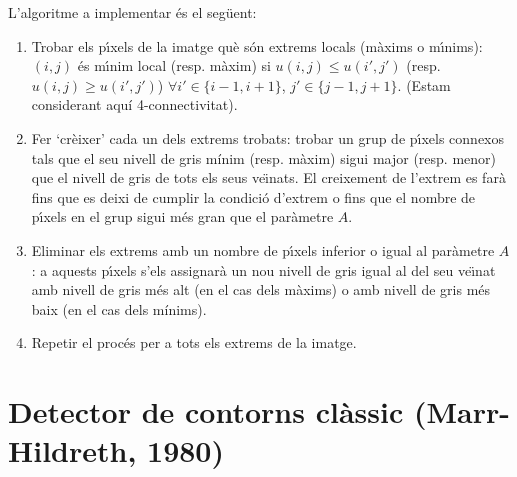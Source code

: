 \documentclass{article}
\begin{document}
L'algoritme a implementar \'es el seg\"uent:
\begin{enumerate}
\item Trobar els p\'\i xels de la imatge qu\`e s\'on extrems locals (m\`axims
o m\'\i nims): $(i,j)$ \'es m\'\i nim local (resp. m\`axim) si $u(i,j) \leq u(i',j')$
(resp. $u(i,j) \geq u(i',j')$) $\forall i' \in \{i-1,i+1\}$, $j' \in \{j-1,j+1\}$. 
(Estam considerant aqu\'i 4-connectivitat).
\item Fer `cr\`eixer' cada un dels extrems trobats: trobar un grup de p\'\i xels connexos
tals que el seu nivell de gris m\'inim (resp. m\`axim) sigui major (resp. menor) que el
nivell de gris de tots els seus ve\"\i nats. El creixement de l'extrem es far\`a fins que es 
deixi de cumplir la condici\'o d'extrem o fins que el nombre de p\'\i xels en el grup 
sigui m\'es gran que el par\`ametre $A$.
\item Eliminar els extrems amb un nombre de p\'\i xels inferior o igual al par\`ametre $A$: 
a aquests p\'\i xels s'els assignar\`a un nou nivell de gris igual al del seu ve\"\i nat
amb nivell de gris m\'es alt (en el cas dels m\`axims) o amb nivell de gris m\'es baix 
(en el cas dels m\'inims).
\item Repetir el proc\'es per a tots els extrems de la imatge.
\end{enumerate}

\section{Detector de contorns cl\`assic (Marr-Hildreth, 1980)}
\end{document}

